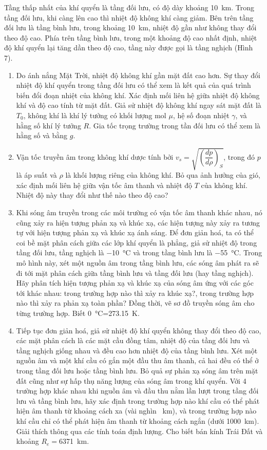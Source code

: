 \noindent Tầng thấp nhất của khí quyển là tầng đối lưu, có độ dày khoảng \SI{10}{\kilo\metre}. Trong tầng đối lưu, khi càng lên cao thì nhiệt độ không khí càng giảm. Bên trên tầng đối lưu là tầng bình lưu, trong khoảng \SI{10}{\kilo\metre}, nhiệt độ gần như không thay đổi theo độ cao. Phía trên tầng bình lưu, trong một khoảng độ cao nhất định, nhiệt độ khí quyển lại tăng dần theo độ cao, tầng này được gọi là tầng nghịch (Hình 7).
\begin{enumerate}
  \item Do ánh nắng Mặt Trời, nhiệt độ không khí gần mặt đất cao hơn. Sự thay đổi nhiệt độ khí quyển trong tầng đối lưu có thể xem là kết quả của quá trình biến đổi đoạn nhiệt của không khí. Xác định mối liên hệ giữa nhiệt độ không khí và độ cao tính từ mặt đất. Giả sử nhiệt độ không khí ngay sát mặt đất là $T_{0}$, không khí là khí lý tưởng có khối lượng mol $\mu$, hệ số đoạn nhiệt $\gamma$, và hằng số khí lý tưởng $R$. Gia tốc trọng trường trong tần đối lưu có thể xem là hằng số và bằng $g$.
  \item Vận tốc truyền âm trong không khí dược tính bởi $v_{s}=\sqrt{\left(\dfrac{dp}{d\rho}\right)_{S}}$, trong đó $p$ là áp suất và $\rho$ là khối lượng riêng của không khí. Bỏ qua ảnh hưởng của gió, xác định mối liên hệ giữa vận tốc âm thanh và nhiệt độ $T$ của không khí. Nhiệt độ này thay đổi như thế nào theo độ cao?
  \item Khi sóng âm truyền trong các môi trường có vận tốc âm thanh khác nhau, nó cũng xảy ra hiện tượng phản xạ và khúc xạ, các hiện tượng này xảy ra tương tự với hiện tượng phản xạ và khúc xạ ánh sáng. Để đơn giản hoá, ta có thể coi bề mặt phân cách giữa các lớp khí quyển là phẳng, giả sử nhiệt độ trong tầng đối lưu, tầng nghịch là \SI{-10}{\celsius} và trong tầng bình lưu là \SI{-55}{\celsius}. Trong mô hình này, xét một nguồn âm trong tầng bình lưu, các sóng âm phát ra sẽ đi tới mặt phân cách giữa tầng bình lưu và tầng đối lưu (hay tầng nghịch). Hãy phân tích hiện tượng phản xạ và khúc xạ của sóng âm ứng với các góc tới khác nhau: trong trường hợp nào thì xảy ra khúc xạ?, trong trường hợp nào thì xảy ra phản xạ toàn phần? Đồng thời, vẽ sơ đồ truyền sóng âm cho từng trường hợp. Biết \SI{0}{\celsius}=\SI{273,15}{\kelvin}.
  \item Tiếp tục đơn giản hoá, giả sử nhiệt độ khí quyển không thay đổi theo độ cao, các mặt phân cách là các mặt cầu đồng tâm, nhiệt độ của tầng đối lưu và tầng nghịch giống nhau và đều cao hơn nhiệt độ của tầng bình lưu. Xét một nguồn âm và một khí cầu có gắn một đầu thu âm thanh, cả hai đều có thể ở trong tầng đối lưu hoặc tầng bình lưu. Bỏ quả sự phản xạ sóng âm trên mặt đất cũng như sự hấp thụ năng lượng của sóng âm trong khí quyển. Với 4 trường hợp khác nhau khi nguồn âm và đầu thu nằm lần lượt trong tầng đối lưu và tầng bình lưu, hãy xác định trong trường hợp nào khí cầu có thể phát hiện âm thanh từ khoảng cách xa (vài nghìn \SI{}{\kilo\metre}), và trong trường hợp nào khí cầu chỉ có thể phát hiện âm thanh từ khoảng cách ngắn (dưới \SI{1000}{\kilo\metre}). Giải thích thông qua các tính toán định lượng. Cho biết bán kính Trái Đất và khoảng $R_{e}=$\SI{6371}{\kilo\metre}.
\end{enumerate}